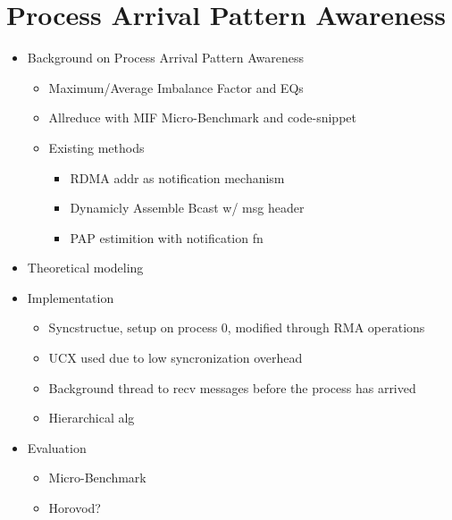 
\glsresetall %
\chapter[PAPAwareness]{Process Arrival Pattern Awareness}\label{ch:PAPAwareness}

\begin{itemize}
    \item Background on Process Arrival Pattern Awareness
    \begin{itemize}
        \item Maximum/Average Imbalance Factor and EQs
        \item Allreduce with MIF Micro-Benchmark and code-snippet
        \item Existing methods
        \begin{itemize}
            \item RDMA addr as notification mechanism \cite{Qian2009ProcArrivalSHMA2AIB}
            \item Dynamicly Assemble Bcast w/ msg header \cite{Patarasuk2008EffBcastDifProcArr}
            \item PAP estimition with notification fn \cite{Proficz2018ImprvAllReduceForImbPAP, Proficz2020PAPAwareScatterGather, Proficz2021AllGatherResilientToImbPAP}
        \end{itemize}
    \end{itemize}
    \item Theoretical modeling
    \item Implementation
    \begin{itemize}
        \item Syncstructue, setup on process 0, modified through RMA operations
        \item UCX used due to low syncronization overhead
        \item Background thread to recv messages before the process has arrived 
        \item Hierarchical alg 
    \end{itemize}
    \item Evaluation
    \begin{itemize}
        \item Micro-Benchmark
        \item Horovod?
    \end{itemize}
\end{itemize}
